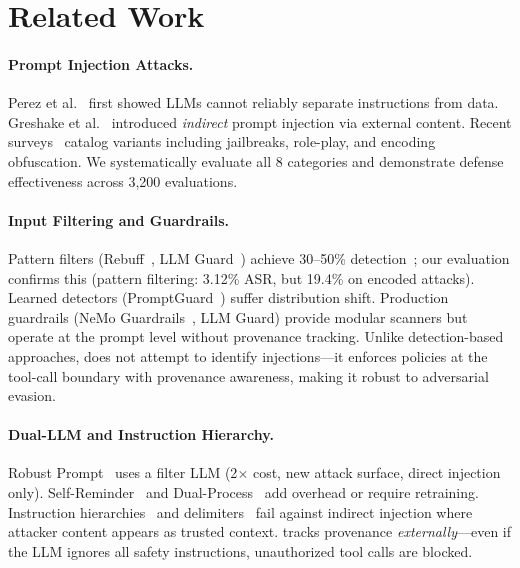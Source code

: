 \section{Related Work}
\label{sec:related}

\paragraph{Prompt Injection Attacks.}
Perez et al.~\cite{perez2022ignore} first showed LLMs cannot reliably separate instructions from data. Greshake et al.~\cite{greshake2023not} introduced \emph{indirect} prompt injection via external content. Recent surveys~\cite{prompt-injection-taxonomy,jailbreak-survey} catalog variants including jailbreaks, role-play, and encoding obfuscation. We systematically evaluate all 8 categories and demonstrate defense effectiveness across 3,200 evaluations.

\paragraph{Input Filtering and Guardrails.}
Pattern filters (Rebuff~\cite{rebuff-defense}, LLM Guard~\cite{llm-guard}) achieve 30--50\% detection~\cite{liu2023prompt}; our evaluation confirms this (pattern filtering: 3.12\% ASR, but 19.4\% on encoded attacks). Learned detectors (PromptGuard~\cite{prompt-guard}) suffer distribution shift. Production guardrails (NeMo Guardrails~\cite{nemo-guardrails}, LLM Guard) provide modular scanners but operate at the prompt level without provenance tracking. Unlike detection-based approaches, \sys{} does not attempt to identify injections---it enforces policies at the tool-call boundary with provenance awareness, making it robust to adversarial evasion.

\paragraph{Dual-LLM and Instruction Hierarchy.}
Robust Prompt~\cite{robust-prompt} uses a filter LLM (2$\times$ cost, new attack surface, direct injection only). Self-Reminder~\cite{self-reminder} and Dual-Process~\cite{dual-llm-defense} add overhead or require retraining. Instruction hierarchies~\cite{openai-system-prompt} and delimiters~\cite{delimiters-defense} fail against indirect injection where attacker content appears as trusted context. \sys{} tracks provenance \emph{externally}---even if the LLM ignores all safety instructions, unauthorized tool calls are blocked.


